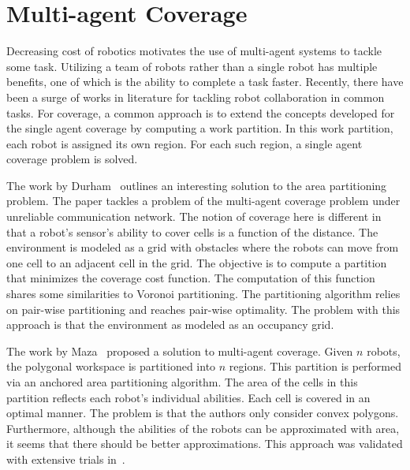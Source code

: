 \documentclass[../main.tex]{subfiles}
\begin{document}
\section{Multi-agent Coverage}
\label{section:multi_agent_coverage_lit_review}

Decreasing cost of robotics motivates the use of multi-agent systems to tackle some task. Utilizing a team of robots rather than a single robot has multiple benefits, one of which is the ability to complete a task faster. Recently, there have been a surge of works in literature for tackling robot collaboration in common tasks. For coverage, a common approach is to extend the concepts developed for the single agent coverage by computing a work partition. In this work partition, each robot is assigned its own region. For each such region, a single agent coverage problem is solved.

The work by Durham~\cite{durham2012discrete} outlines an interesting solution to the area partitioning problem. The paper tackles a problem of the multi-agent coverage problem under unreliable communication network. The notion of coverage here is different in that a robot's sensor's ability to cover cells is a function of the distance. The environment is modeled as a grid with obstacles where the robots can move from one cell to an adjacent cell in the grid. The objective is to compute a partition that minimizes the coverage cost function. The computation of this function shares some similarities to Voronoi partitioning. The partitioning algorithm relies on pair-wise partitioning and reaches pair-wise optimality. The problem with this approach is that the environment as modeled as an occupancy grid. 

The work by Maza~\cite{maza2007multiple} proposed a solution to multi-agent coverage. Given $n$ robots, the polygonal workspace is partitioned into $n$ regions. This partition is performed via an anchored area partitioning algorithm. The area of the cells in this partition reflects each robot's individual abilities. Each cell is covered in an optimal manner. The problem is that the authors only consider convex polygons. Furthermore, although the abilities of the robots can be approximated with area, it seems that there should be better approximations. This approach was validated with extensive trials in~\cite{barrientos2011aerial}.
\end{document}
